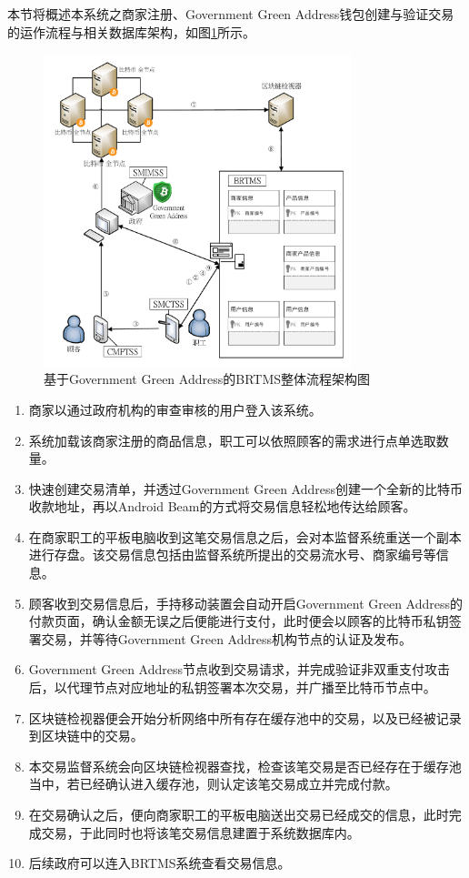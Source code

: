 本节将概述本系统之商家注册、Government Green Address钱包创建与验证交易的运作流程与相关数据库架构，如图\ref{gabpcss}所示。

	\begin{figure}[!htbp]
		\centering
		\includegraphics[width = 0.8\textwidth]{gabpcss.pdf}
		\caption{基于Government Green Address的BRTMS整体流程架构图}\label{gabpcss}
	\end{figure}

	\begin{enumerate}
		\item 商家以通过政府机构的审查审核的用户登入该系统。
		\item 系统加载该商家注册的商品信息，职工可以依照顾客的需求进行点单选取数量。
		\item 快速创建交易清单，并透过Government Green Address创建一个全新的比特币收款地址，再以Android Beam的方式将交易信息轻松地传达给顾客。
		\item 在商家职工的平板电脑收到这笔交易信息之后，会对本监督系统重送一个副本进行存盘。该交易信息包括由监督系统所提出的交易流水号、商家编号等信息。
		\item 顾客收到交易信息后，手持移动装置会自动开启Government Green Address的付款页面，确认金额无误之后便能进行支付，此时便会以顾客的比特币私钥签署交易，并等待Government Green Address机构节点的认证及发布。
		\item Government Green Address节点收到交易请求，并完成验证非双重支付攻击后，以代理节点对应地址的私钥签署本次交易，并广播至比特币节点中。
		\item 区块链检视器便会开始分析网络中所有存在缓存池中的交易，以及已经被记录到区块链中的交易。
		\item 本交易监督系统会向区块链检视器查找，检查该笔交易是否已经存在于缓存池当中，若已经确认进入缓存池，则认定该笔交易成立并完成付款。
		\item 在交易确认之后，便向商家职工的平板电脑送出交易已经成交的信息，此时完成交易，于此同时也将该笔交易信息建置于系统数据库内。
		\item 后续政府可以连入BRTMS系统查看交易信息。
	\end{enumerate}